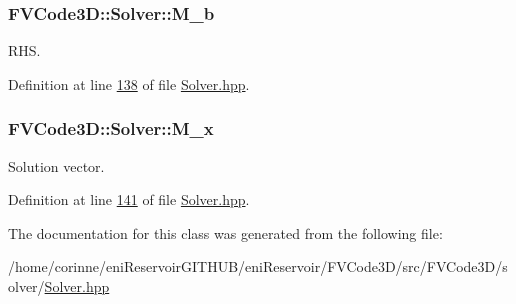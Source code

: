 \subsubsection[{\texorpdfstring{M\+\_\+b}{M_b}}]{ F\+V\+Code3\+D\+::\+Solver\+::\+M\+\_\+b\hspace{0.3cm}{\ttfamily [protected]}}\hypertarget{classFVCode3D_1_1Solver_ac1203c2ea481f5ebd0ce061c1e8073d3}{}\label{classFVCode3D_1_1Solver_ac1203c2ea481f5ebd0ce061c1e8073d3}


R\+HS. 



Definition at line \hyperlink{Solver_8hpp_source_l00138}{138} of file \hyperlink{Solver_8hpp_source}{Solver.\+hpp}.

\subsubsection[{\texorpdfstring{M\+\_\+x}{M_x}}]{ F\+V\+Code3\+D\+::\+Solver\+::\+M\+\_\+x\hspace{0.3cm}{\ttfamily [protected]}}\hypertarget{classFVCode3D_1_1Solver_a6414eabf461e95a8fc5b8a49bb06e8cb}{}\label{classFVCode3D_1_1Solver_a6414eabf461e95a8fc5b8a49bb06e8cb}


Solution vector. 



Definition at line \hyperlink{Solver_8hpp_source_l00141}{141} of file \hyperlink{Solver_8hpp_source}{Solver.\+hpp}.



The documentation for this class was generated from the following file\+:\begin{DoxyCompactItemize}
\item 
/home/corinne/eni\+Reservoir\+G\+I\+T\+H\+U\+B/eni\+Reservoir/\+F\+V\+Code3\+D/src/\+F\+V\+Code3\+D/solver/\hyperlink{Solver_8hpp}{Solver.\+hpp}\end{DoxyCompactItemize}
